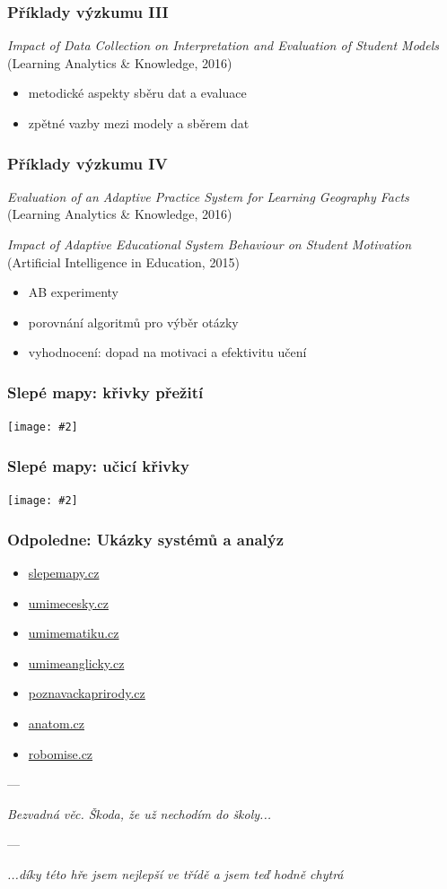\documentclass[bigger]{beamer}
\newcommand{\img}[2]{\begin{center}\texttt{[image: \#2]}\end{center}}
\begin{document}
\begin{frame}
  \frametitle{Příklady výzkumu III}

  \emph{Impact of Data Collection on Interpretation and Evaluation of Student
    Models} (Learning Analytics \& Knowledge, 2016)

  \bigskip

  \begin{itemize}
  \item metodické aspekty sběru dat a evaluace
  \item zpětné vazby mezi modely a sběrem dat
  \end{itemize}
\end{frame}

\begin{frame}
  \frametitle{Příklady výzkumu IV}

  \emph{Evaluation of an Adaptive Practice System for Learning Geography Facts}
  (Learning Analytics \& Knowledge, 2016)

  \emph{Impact of Adaptive Educational System Behaviour on Student Motivation } (Artificial Intelligence in Education, 2015)

  \bigskip

  \begin{itemize}
  \item AB experimenty
  \item porovnání algoritmů pro výběr otázky
  \item vyhodnocení: dopad na motivaci a efektivitu učení
  \end{itemize}
\end{frame}

\begin{frame}
  \frametitle{Slepé mapy: křivky přežití}

  \img{.95}{survival_curve_by_ab}
\end{frame}

\begin{frame}
  \frametitle{Slepé mapy: učicí křivky}

  \img{.95}{target_difficulty_context_learning_slope}
\end{frame}

\begin{frame}
   \frametitle{Odpoledne: Ukázky systémů a analýz}

   \begin{itemize}
   \item \url{slepemapy.cz}
   \item \url{umimecesky.cz}
   \item \url{umimematiku.cz}
   \item \url{umimeanglicky.cz}
   \item \url{poznavackaprirody.cz}
   \item \url{anatom.cz}
   \item \url{robomise.cz}
   \end{itemize}
---
\medskip

\emph{Bezvadná věc. Škoda, že už nechodím do školy...}

\medskip
---
\medskip

\emph{...díky této hře jsem nejlepší ve třídě a jsem teď hodně chytrá}

\end{frame}
\end{document}
